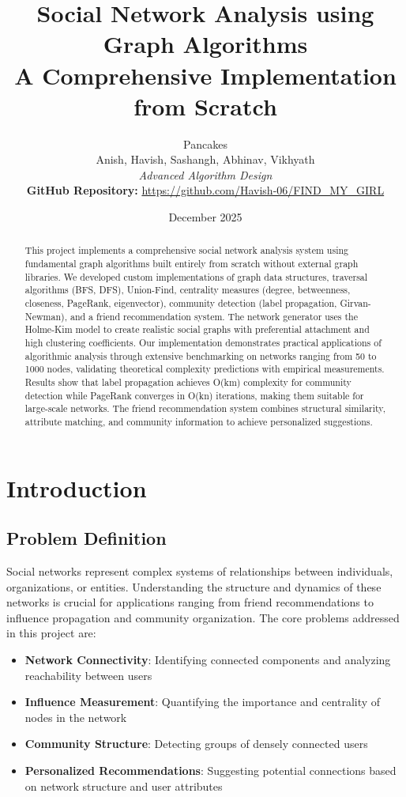 \documentclass[12pt,a4paper]{article}
\title{\textbf{Social Network Analysis using Graph Algorithms}\\
\large A Comprehensive Implementation from Scratch}
\author{
Pancakes\\
Anish, Havish, Sashangh, Abhinav, Vikhyath\\
\textit{Advanced Algorithm Design}\\
\vspace{0.3cm}
\textbf{GitHub Repository:} \url{https://github.com/Havish-06/FIND_MY_GIRL}
}
\date{December 2025}
\begin{document}
\maketitle

\begin{abstract}
This project implements a comprehensive social network analysis system using fundamental graph algorithms built entirely from scratch without external graph libraries. We developed custom implementations of graph data structures, traversal algorithms (BFS, DFS), Union-Find, centrality measures (degree, betweenness, closeness, PageRank, eigenvector), community detection (label propagation, Girvan-Newman), and a friend recommendation system. The network generator uses the Holme-Kim model to create realistic social graphs with preferential attachment and high clustering coefficients. Our implementation demonstrates practical applications of algorithmic analysis through extensive benchmarking on networks ranging from 50 to 1000 nodes, validating theoretical complexity predictions with empirical measurements. Results show that label propagation achieves O(km) complexity for community detection while PageRank converges in O(kn) iterations, making them suitable for large-scale networks. The friend recommendation system combines structural similarity, attribute matching, and community information to achieve personalized suggestions.
\end{abstract}

\newpage
\tableofcontents
\newpage

\section{Introduction}

\subsection{Problem Definition}
Social networks represent complex systems of relationships between individuals, organizations, or entities. Understanding the structure and dynamics of these networks is crucial for applications ranging from friend recommendations to influence propagation and community organization. The core problems addressed in this project are:

\begin{itemize}
    \item \textbf{Network Connectivity}: Identifying connected components and analyzing reachability between users
    \item \textbf{Influence Measurement}: Quantifying the importance and centrality of nodes in the network
    \item \textbf{Community Structure}: Detecting groups of densely connected users
    \item \textbf{Personalized Recommendations}: Suggesting potential connections based on network structure and user attributes
\end{itemize}
\end{document}
